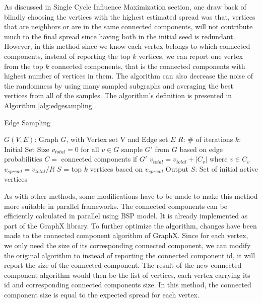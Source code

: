 \documentclass[english]{tktltiki}
\begin{document}
As discussed in Single Cycle Influence Maximization section, one draw back of blindly choosing the vertices with the highest estimated spread was that, vertices that are neighbors or are in the same connected components, will not contribute much to the final spread since having both in the initial seed is redundant.
However, in this method since we know each vertex belongs to which connected components, instead of reporting the top $k$ vertices, we can report one vertex from the top $k$ connected components, that is the connected components with highest number of vertices in them. 
The algorithm can also decrease the noise of the randomness by using many sampled subgraphs and averaging the best vertices from all of the samples. 
The algorithm's definition is presented in Algorithm \ref{alg:edgesampling}.
\begin{algorithm}[ht!]
\caption{Edge Sampling}
\label{alg:edgesampling}
\begin{algorithmic}
\Require $G(V,E)$: Graph $G$, with Vertex set V and Edge set $E$
\Require $R$: \# of iterations
\Require $k$: Initial Set Size
\State $v_{total}=0$ for all $v \in G$
	\State sample $G'$ from $G$ based on edge probabilities
	\State $C =$ connected components if $G'$
       	\State $v_{total} = v_{total} + |C_v|$ where $v \in C_v$
	\EndFor
\EndFor
{}
	\State $v_{spread}=v_{total}/R$
\EndFor
\State $S$ = top $k$ vertices based on $v_{spread}$
\State Output $S$: Set of initial active vertices
\end{algorithmic}
\end{algorithm}
As with other methods, some modifications have to be made to make this method more suitable in parallel frameworks. 
The connected components can be efficiently calculated in parallel using BSP model. 
It is already implemented as part of the GraphX library. 
To further optimize the algorithm, changes have been made to the connected component algorithm of GraphX. 
Since for each vertex, we only need the size of its corresponding connected component, we can modify the original algorithm to instead of reporting the connected component id, it will report the size of the connected component. 
The result of the new connected component algorithm would then be the list of vertices, each vertex carrying its id and corresponding connected components size. 
In this method, the connected component size is equal to the expected spread for each vertex. 
\end{document}
